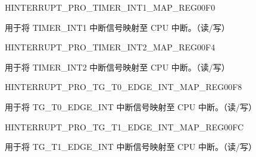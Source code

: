 \begin{register}{H}{INTERRUPT\_PRO\_TIMER\_INT1\_MAP\_REG}{\hexprefix{}00F0}\label{regdesc:INTERRUPTPROTIMERINT1MAPREG}
%
%
\regnewline%
\begin{regdesc}\begin{reglist}
\label{fielddesc:INTERRUPTPROTIMERINT1MAP}\item [INTERRUPT\_PRO\_TIMER\_INT1\_MAP] 用于将 TIMER\_INT1 中断信号映射至 CPU 中断。（读/写）
\end{reglist}\end{regdesc}
\end{register}


\begin{register}{H}{INTERRUPT\_PRO\_TIMER\_INT2\_MAP\_REG}{\hexprefix{}00F4}\label{regdesc:INTERRUPTPROTIMERINT2MAPREG}
%
%
\regnewline%
\begin{regdesc}\begin{reglist}
\label{fielddesc:INTERRUPTPROTIMERINT2MAP}\item [INTERRUPT\_PRO\_TIMER\_INT2\_MAP] 用于将 TIMER\_INT2 中断信号映射至 CPU 中断。（读/写）
\end{reglist}\end{regdesc}
\end{register}


\begin{register}{H}{INTERRUPT\_PRO\_TG\_T0\_EDGE\_INT\_MAP\_REG}{\hexprefix{}00F8}\label{regdesc:INTERRUPTPROTGT0EDGEINTMAPREG}
%
%
\regnewline%
\begin{regdesc}\begin{reglist}
\label{fielddesc:INTERRUPTPROTGT0EDGEINTMAP}\item [INTERRUPT\_PRO\_TG\_T0\_EDGE\_INT\_MAP] 用于将 TG\_T0\_EDGE\_INT 中断信号映射至 CPU 中断。（读/写）
\end{reglist}\end{regdesc}
\end{register}


\begin{register}{H}{INTERRUPT\_PRO\_TG\_T1\_EDGE\_INT\_MAP\_REG}{\hexprefix{}00FC}\label{regdesc:INTERRUPTPROTGT1EDGEINTMAPREG}
%
%
\regnewline%
\begin{regdesc}\begin{reglist}
\label{fielddesc:INTERRUPTPROTGT1EDGEINTMAP}\item [INTERRUPT\_PRO\_TG\_T1\_EDGE\_INT\_MAP] 用于将 TG\_T1\_EDGE\_INT 中断信号映射至 CPU 中断。（读/写）
\end{reglist}\end{regdesc}
\end{register}


